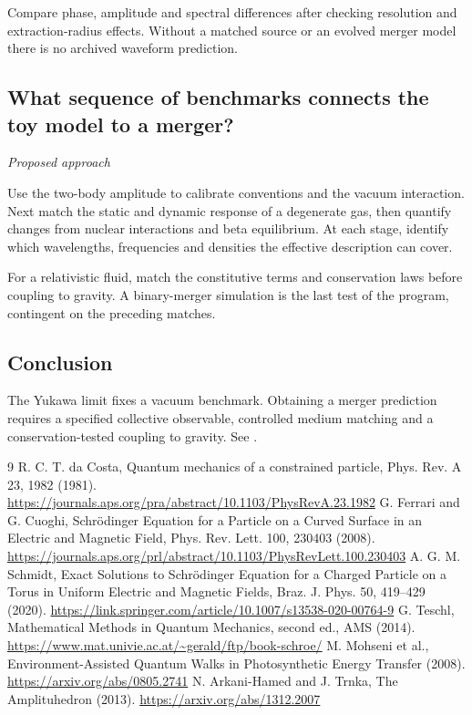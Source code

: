 \documentclass[11pt]{article}
\begin{document}
Compare phase, amplitude and spectral differences after checking resolution and extraction-radius effects. Without a matched source or an evolved merger model there is no archived waveform prediction.

\subsection{What sequence of benchmarks connects the toy model to a merger?}
\label{problem:collective-workflow}
\textit{Proposed approach}

Use the two-body amplitude to calibrate conventions and the vacuum interaction. Next match the static and dynamic response of a degenerate gas, then quantify changes from nuclear interactions and beta equilibrium. At each stage, identify which wavelengths, frequencies and densities the effective description can cover.

For a relativistic fluid, match the constitutive terms and conservation laws before coupling to gravity. A binary-merger simulation is the last test of the program, contingent on the preceding matches.

\subsection*{Conclusion}
The Yukawa limit fixes a vacuum benchmark. Obtaining a merger prediction requires a specified collective observable, controlled medium matching and a conservation-tested coupling to gravity.
See \cite{ref6}.

\begin{thebibliography}{9}
 R. C. T. da Costa, Quantum mechanics of a constrained particle, Phys. Rev. A 23, 1982 (1981). \url{https://journals.aps.org/pra/abstract/10.1103/PhysRevA.23.1982}
 G. Ferrari and G. Cuoghi, Schr\"{o}dinger Equation for a Particle on a Curved Surface in an Electric and Magnetic Field, Phys. Rev. Lett. 100, 230403 (2008). \url{https://journals.aps.org/prl/abstract/10.1103/PhysRevLett.100.230403}
 A. G. M. Schmidt, Exact Solutions to Schr\"{o}dinger Equation for a Charged Particle on a Torus in Uniform Electric and Magnetic Fields, Braz. J. Phys. 50, 419--429 (2020). \url{https://link.springer.com/article/10.1007/s13538-020-00764-9}
 G. Teschl, Mathematical Methods in Quantum Mechanics, second ed., AMS (2014). \url{https://www.mat.univie.ac.at/~gerald/ftp/book-schroe/}
 M. Mohseni et al., Environment-Assisted Quantum Walks in Photosynthetic Energy Transfer (2008). \url{https://arxiv.org/abs/0805.2741}
 N. Arkani-Hamed and J. Trnka, The Amplituhedron (2013). \url{https://arxiv.org/abs/1312.2007}
\end{thebibliography}
\end{document}
